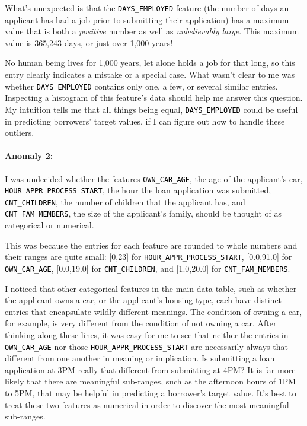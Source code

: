 \documentclass[12pt, letterpaper]{article}
\begin{document}
What's unexpected is that the \colorbox{backcolor}{\textcolor{black}{\texttt{DAYS_EMPLOYED}}} feature (the number of days an applicant has had a job prior to submitting their application) has a maximum value that is both a \textit{positive} number as well as \textit{unbelievably large}. This maximum value is 365,243 days, or just over 1,000 years!

No human being lives for 1,000 years, let alone holds a job for that long, so this entry clearly indicates a mistake or a special case. What wasn't clear to me was whether \colorbox{backcolor}{\textcolor{black}{\texttt{DAYS_EMPLOYED}}} contains only one, a few, or several similar entries. Inspecting a histogram of this feature's data should help me answer this question. My intuition tells me that all things being equal, \colorbox{backcolor}{\textcolor{black}{\texttt{DAYS_EMPLOYED}}} could be useful in predicting borrowers' target values, if I can figure out how to handle these outliers.

\paragraph{Anomaly 2:}
I was undecided whether the features \colorbox{backcolor}{\textcolor{black}{\texttt{OWN_CAR_AGE}}}, the age of the applicant's car,  \colorbox{backcolor}{\textcolor{black}{\texttt{HOUR_APPR_PROCESS_START}}}, the hour the loan application was submitted, \colorbox{backcolor}{\textcolor{black}{\texttt{CNT_CHILDREN}}}, the number of children that the applicant has, and \colorbox{backcolor}{\textcolor{black}{\texttt{CNT_FAM_MEMBERS}}}, the size of the applicant's family, should be thought of as categorical or numerical.

This was because the entries for each feature are rounded to whole numbers and their ranges are quite small: [0,23] for \colorbox{backcolor}{\textcolor{black}{\texttt{HOUR_APPR_PROCESS_START}}}, [0.0,91.0] for \colorbox{backcolor}{\textcolor{black}{\texttt{OWN_CAR_AGE}}}, [0.0,19.0] for \colorbox{backcolor}{\textcolor{black}{\texttt{CNT_CHILDREN}}}, and [1.0,20.0] for \colorbox{backcolor}{\textcolor{black}{\texttt{CNT_FAM_MEMBERS}}}.

I noticed that other categorical features in the main data table, such as whether the applicant owns a car, or the applicant's housing type, each have distinct entries that encapsulate wildly different meanings. The condition of owning a car, for example, is very different from the condition of not owning a car. After thinking along these lines, it was easy for me to see that neither the entries in \colorbox{backcolor}{\textcolor{black}{\texttt{OWN_CAR_AGE}}} nor those \colorbox{backcolor}{\textcolor{black}{\texttt{HOUR_APPR_PROCESS_START}}} are necessarily always that different from one another in meaning or implication. Is submitting a loan application at 3PM really that different from submitting at 4PM? It is far more likely that there are meaningful sub-ranges, such as the afternoon hours of 1PM to 5PM, that may be helpful in predicting a borrower's target value. It's best to treat these two features as numerical in order to discover the most meaningful sub-ranges.
\end{document}
